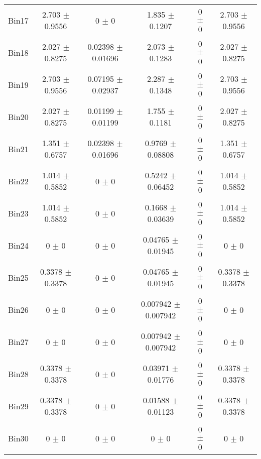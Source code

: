 \begin{tabular}{@{\extracolsep{4pt}}lccccc@{}}
     Bin17 & 2.703 $\pm$ 0.9556 & 0 $\pm$ 0 & 1.835 $\pm$ 0.1207 & 0 $\pm$ 0 & 2.703 $\pm$ 0.9556 \\ 
     Bin18 & 2.027 $\pm$ 0.8275 & 0.02398 $\pm$ 0.01696 & 2.073 $\pm$ 0.1283 & 0 $\pm$ 0 & 2.027 $\pm$ 0.8275 \\ 
     Bin19 & 2.703 $\pm$ 0.9556 & 0.07195 $\pm$ 0.02937 & 2.287 $\pm$ 0.1348 & 0 $\pm$ 0 & 2.703 $\pm$ 0.9556 \\ 
     Bin20 & 2.027 $\pm$ 0.8275 & 0.01199 $\pm$ 0.01199 & 1.755 $\pm$ 0.1181 & 0 $\pm$ 0 & 2.027 $\pm$ 0.8275 \\ 
     Bin21 & 1.351 $\pm$ 0.6757 & 0.02398 $\pm$ 0.01696 & 0.9769 $\pm$ 0.08808 & 0 $\pm$ 0 & 1.351 $\pm$ 0.6757 \\ 
     Bin22 & 1.014 $\pm$ 0.5852 & 0 $\pm$ 0 & 0.5242 $\pm$ 0.06452 & 0 $\pm$ 0 & 1.014 $\pm$ 0.5852 \\ 
     Bin23 & 1.014 $\pm$ 0.5852 & 0 $\pm$ 0 & 0.1668 $\pm$ 0.03639 & 0 $\pm$ 0 & 1.014 $\pm$ 0.5852 \\ 
     Bin24 & 0 $\pm$ 0 & 0 $\pm$ 0 & 0.04765 $\pm$ 0.01945 & 0 $\pm$ 0 & 0 $\pm$ 0 \\ 
     Bin25 & 0.3378 $\pm$ 0.3378 & 0 $\pm$ 0 & 0.04765 $\pm$ 0.01945 & 0 $\pm$ 0 & 0.3378 $\pm$ 0.3378 \\ 
     Bin26 & 0 $\pm$ 0 & 0 $\pm$ 0 & 0.007942 $\pm$ 0.007942 & 0 $\pm$ 0 & 0 $\pm$ 0 \\ 
     Bin27 & 0 $\pm$ 0 & 0 $\pm$ 0 & 0.007942 $\pm$ 0.007942 & 0 $\pm$ 0 & 0 $\pm$ 0 \\ 
     Bin28 & 0.3378 $\pm$ 0.3378 & 0 $\pm$ 0 & 0.03971 $\pm$ 0.01776 & 0 $\pm$ 0 & 0.3378 $\pm$ 0.3378 \\ 
     Bin29 & 0.3378 $\pm$ 0.3378 & 0 $\pm$ 0 & 0.01588 $\pm$ 0.01123 & 0 $\pm$ 0 & 0.3378 $\pm$ 0.3378 \\ 
     Bin30 & 0 $\pm$ 0 & 0 $\pm$ 0 & 0 $\pm$ 0 & 0 $\pm$ 0 & 0 $\pm$ 0 \\ 
\hline\hline
  \end{tabular}
